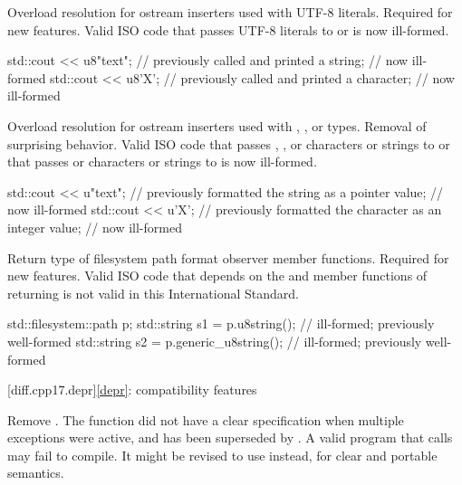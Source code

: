 \change
Overload resolution for ostream inserters used with UTF-8 literals.
\rationale
Required for new features.
\effect
Valid ISO \CppXVII{} code that passes UTF-8 literals to
 or
 is now ill-formed.
\begin{codeblock}
std::cout << u8"text";          // previously called  and printed a string;
                                // now ill-formed
std::cout << u8'X';             // previously called  and printed a character;
                                // now ill-formed
\end{codeblock}

\change
Overload resolution for ostream inserters
used with , , or  types.
\rationale
Removal of surprising behavior.
\effect
Valid ISO \CppXVII{} code that passes
, , or  characters or strings
to  or
that passes  or  characters or strings
to  is now ill-formed.
\begin{codeblock}
std::cout << u"text";           // previously formatted the string as a pointer value;
                                // now ill-formed
std::cout << u'X';              // previously formatted the character as an integer value;
                                // now ill-formed
\end{codeblock}

\change
Return type of filesystem path format observer member functions.
\rationale
Required for new features.
\effect
Valid ISO \CppXVII{} code that depends on the  and
 member functions of 
returning  is not valid in this International Standard.
\begin{codeblock}
std::filesystem::path p;
std::string s1 = p.u8string();          // ill-formed; previously well-formed
std::string s2 = p.generic_u8string();  // ill-formed; previously well-formed
\end{codeblock}

[diff.cpp17.depr]{\ref{depr}: compatibility features}

\nodiffref
\change
Remove .
\rationale
The function did not have a clear specification when multiple exceptions were
active, and has been superseded by .
\effect
A valid \CppXVII{} program that calls  may fail
to compile. It might be revised to use  instead,
for clear and portable semantics.

